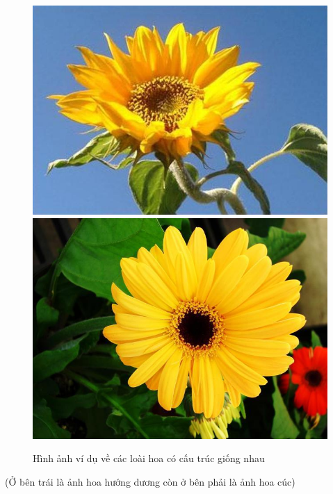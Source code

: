 \documentclass[12pt]{report}
\begin{document}
		\begin{figure}[h]
			\centering
			\includegraphics[scale=0.3]{anh_4}
			\includegraphics[scale=0.3]{anh_3}
			\caption{Hình ảnh ví dụ về các loài hoa có cấu trúc giống nhau}
			\label{fig:anh_1}
		\end{figure}
		(Ở bên trái là ảnh hoa hướng dương còn ở bên phải là ảnh hoa cúc)
																																																																				
\end{document}
